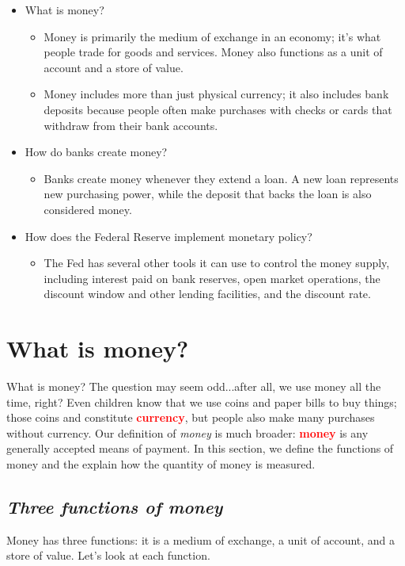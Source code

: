 \documentclass[11pt]{article} %
\begin{document}
\begin{tcolorbox}[width=\textwidth,colback={white},title={Big Questions},colbacktitle=yellow,coltitle=blue]
\begin{itemize}
\item What is money?
\begin{itemize}
\item Money is primarily the medium of exchange in an economy; it's what people trade for goods and services. Money also functions as a unit of account and a store of value.
\item Money includes more than just physical currency; it also includes bank deposits because people often make purchases with checks or cards that withdraw from their bank accounts.
\end{itemize}
\item How do banks create money?
\begin{itemize}
\item Banks create money whenever they extend a loan. A new loan represents new purchasing power, while the deposit that backs the loan is also considered money.
\end{itemize}
\item How does the Federal Reserve implement monetary policy?
\begin{itemize}
\item The Fed has several other tools it can use to control the money supply, including interest paid on bank reserves, open market operations, the discount window and other lending facilities, and the discount rate.
\end{itemize}
\end{itemize}
\end{tcolorbox}

\section*{\textbf{What is money?}}
What is money? The question may seem odd...after all, we use money all the time, right? Even children know that we use coins and paper bills to buy things; those coins and constitute \textbf{\textcolor{red}{currency}}, but people also make many purchases without currency. Our definition of \textit{money} is much broader: \textbf{\textcolor{red}{money}} is any generally accepted means of payment. In this section, we define the functions of money and the explain how the quantity of money is measured.

\subsection*{\textbf{\textit{Three functions of money}}}
Money has three functions: it is a medium of exchange, a unit of account, and a store of value. Let's look at each function.
\end{document}
